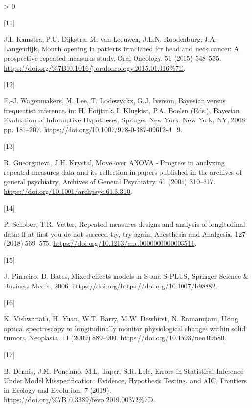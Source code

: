 \documentclass[
]{article}
\newlength{\cslhangindent}
\newlength{\csllabelwidth}
\newenvironment{CSLReferences}[2] %
 {%
  \setlength{\parindent}{0pt}
  \ifodd #1 \everypar{\setlength{\hangindent}{\cslhangindent}}\ignorespaces\fi
  \ifnum #2 > 0
  \setlength{\parskip}{#2\baselineskip}
  \fi
 }%
 {}
\newcommand{\CSLLeftMargin}[1]{\parbox[t]{\csllabelwidth}{#1}}
\newcommand{\CSLRightInline}[1]{\parbox[t]{\linewidth - \csllabelwidth}{#1}\break}
\begin{document}
\begin{CSLReferences}{0}{0}
\leavevmode\hypertarget{ref-kamstra2015}{}%
\CSLLeftMargin{{[}11{]} }
\CSLRightInline{J.I. Kamstra, P.U. Dijkstra, M. van Leeuwen, J.L.N. Roodenburg, J.A. Langendijk, {Mouth opening in patients irradiated for head and neck cancer: A prospective repeated measures study}, {Oral Oncology}. {51} (2015) 548--555. \url{https://doi.org/\%7B10.1016/j.oraloncology.2015.01.016\%7D}.}

\leavevmode\hypertarget{ref-wagenmakers2008}{}%
\CSLLeftMargin{{[}12{]} }
\CSLRightInline{E.-J. Wagenmakers, M. Lee, T. Lodewyckx, G.J. Iverson, Bayesian versus frequentist inference, in: H. Hoijtink, I. Klugkist, P.A. Boelen (Eds.), Bayesian Evaluation of Informative Hypotheses, Springer New York, New York, NY, 2008: pp. 181--207. \url{https://doi.org/10.1007/978-0-387-09612-4_9}.}

\leavevmode\hypertarget{ref-gueorguieva2004}{}%
\CSLLeftMargin{{[}13{]} }
\CSLRightInline{R. Gueorguieva, J.H. Krystal, {Move over ANOVA - Progress in analyzing repeated-measures data and its reflection in papers published in the archives of general psychiatry}, Archives of General Psychiatry. 61 (2004) 310--317. \url{https://doi.org/10.1001/archpsyc.61.3.310}.}

\leavevmode\hypertarget{ref-schober2018}{}%
\CSLLeftMargin{{[}14{]} }
\CSLRightInline{P. Schober, T.R. Vetter, Repeated measures designs and analysis of longitudinal data: If at first you do not succeed-try, try again, Anesthesia and Analgesia. 127 (2018) 569--575. \url{https://doi.org/10.1213/ane.0000000000003511}.}

\leavevmode\hypertarget{ref-pinheiro2006}{}%
\CSLLeftMargin{{[}15{]} }
\CSLRightInline{J. Pinheiro, D. Bates, {Mixed-effects models in S and S-PLUS}, Springer Science \& Business Media, 2006. https://doi.org/\url{https://doi.org/10.1007/b98882}.}

\leavevmode\hypertarget{ref-vishwanath2009}{}%
\CSLLeftMargin{{[}16{]} }
\CSLRightInline{K. Vishwanath, H. Yuan, W.T. Barry, M.W. Dewhirst, N. Ramanujam, Using optical spectroscopy to longitudinally monitor physiological changes within solid tumors, Neoplasia. 11 (2009) 889--900. \url{https://doi.org/10.1593/neo.09580}.}

\leavevmode\hypertarget{ref-dennis2019}{}%
\CSLLeftMargin{{[}17{]} }
\CSLRightInline{B. Dennis, J.M. Ponciano, M.L. Taper, S.R. Lele, {Errors in Statistical Inference Under Model Misspecification: Evidence, Hypothesis Testing, and AIC}, {Frontiers in Ecology and Evolution}. {7} (2019). \url{https://doi.org/\%7B10.3389/fevo.2019.00372\%7D}.}


\end{CSLReferences}
\end{document}
